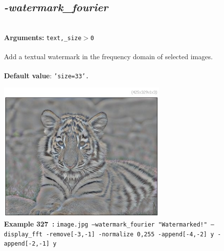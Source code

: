 \documentclass[a4paper,11pt,twoside]{book}
\begin{document}
\subsection{\emph{-watermark\_fourier} }\vspace*{-0.5em}
~\\\textbf{Arguments: } 
{\small \texttt{text,\_size$>$0}}\\~\\
Add a textual watermark in the frequency domain of selected images.
~\\~\\\textbf{Default value}: {\small \texttt{'size=33'.}}
\begin{center}\includegraphics[keepaspectratio=true,height=7cm,width=\textwidth]{img/gmic_def327.jpg}\\
{\footnotesize \textbf{Example 327~:} \texttt{image.jpg --watermark\_fourier "Watermarked!" --display\_fft -remove[-3,-1] -normalize 0,255 -append[-4,-2] y -append[-2,-1] y}}
\end{center}
\end{document}
